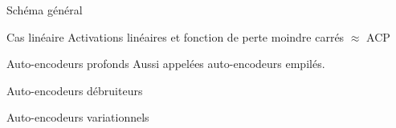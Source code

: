 \begin{frame}{Schéma général}
\end{frame}

\begin{frame}{Cas linéaire}
  Activations linéaires et fonction de perte moindre carrés $\approx$ ACP
\end{frame}

\begin{frame}{Auto-encodeurs profonds}
  Aussi appelées auto-encodeurs empilés.
\end{frame}

\begin{frame}{Auto-encodeurs débruiteurs}
\end{frame}

\begin{frame}{Auto-encodeurs variationnels}
\end{frame}
